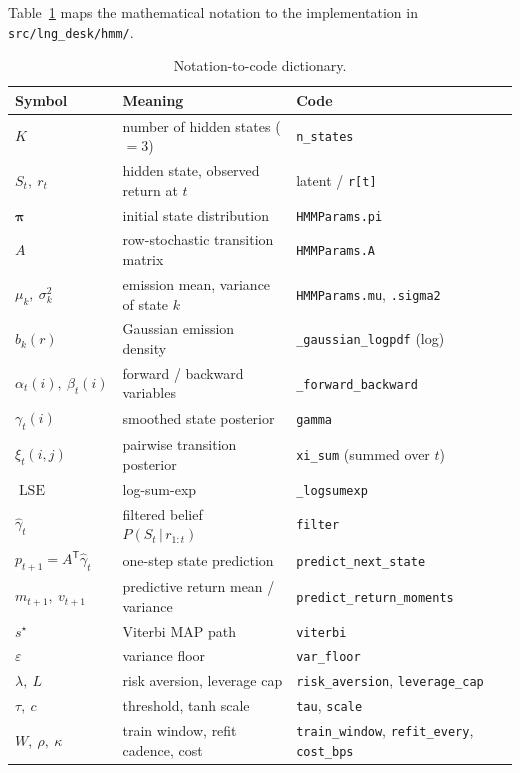 \documentclass[11pt]{article}
\newcommand{\Tr}{^{\mathsf{T}}}              %
\newcommand{\given}{\,\vert\,}
\newcommand{\state}{S}
\newcommand{\obs}{r}
\newcommand{\nstate}{K}
\newcommand{\fwd}{\alpha}
\newcommand{\bwd}{\beta}
\theoremstyle{plain}
\theoremstyle{definition}
\theoremstyle{remark}
\begin{document}
Table~\ref{tab:symbols} maps the mathematical notation to the implementation in
\texttt{src/lng\_desk/hmm/}.

\begin{table}[h]
\centering
\small
\begin{tabular}{@{}lll@{}}
\toprule
Symbol & Meaning & Code \\
\midrule
$\nstate$ & number of hidden states ($=3$) & \texttt{n\_states} \\
$\state_t,\ \obs_t$ & hidden state, observed return at $t$ & latent / \texttt{r[t]} \\
$\bm\pi$ & initial state distribution & \texttt{HMMParams.pi} \\
$A$ & row-stochastic transition matrix & \texttt{HMMParams.A} \\
$\mu_k,\ \sigma_k^2$ & emission mean, variance of state $k$ & \texttt{HMMParams.mu}, \texttt{.sigma2} \\
$b_k(\obs)$ & Gaussian emission density & \texttt{\_gaussian\_logpdf} (log) \\
$\fwd_t(i),\ \bwd_t(i)$ & forward / backward variables & \texttt{\_forward\_backward} \\
$\gamma_t(i)$ & smoothed state posterior & \texttt{gamma} \\
$\xi_t(i,j)$ & pairwise transition posterior & \texttt{xi\_sum} (summed over $t$) \\
$\operatorname{LSE}$ & log-sum-exp & \texttt{\_logsumexp} \\
$\hat\gamma_t$ & filtered belief $P(\state_t\given\obs_{1:t})$ & \texttt{filter} \\
$p_{t+1}=A\Tr\hat\gamma_t$ & one-step state prediction & \texttt{predict\_next\_state} \\
$m_{t+1},\ v_{t+1}$ & predictive return mean / variance & \texttt{predict\_return\_moments} \\
$s^\star$ & Viterbi MAP path & \texttt{viterbi} \\
$\varepsilon$ & variance floor & \texttt{var\_floor} \\
$\lambda,\ L$ & risk aversion, leverage cap & \texttt{risk\_aversion}, \texttt{leverage\_cap} \\
$\tau,\ c$ & threshold, tanh scale & \texttt{tau}, \texttt{scale} \\
$W,\ \rho,\ \kappa$ & train window, refit cadence, cost & \texttt{train\_window}, \texttt{refit\_every}, \texttt{cost\_bps} \\
\bottomrule
\end{tabular}
\caption{Notation-to-code dictionary.}
\label{tab:symbols}
\end{table}
\end{document}
